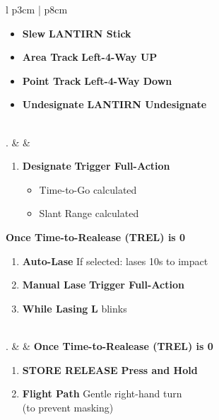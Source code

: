 \documentclass[8pt,usenames,dvipsnames,twoside]{article}
\begin{document}
\begin{center}
\begin{longtable}{l p{3cm} | p{8cm}}
\begin{minipage}[t]{\linewidth}
\begin{itemize}
						\item \textbf{Slew} \dotfill \textbf{LANTIRN Stick}
						\item \textbf{Area Track} \dotfill \textbf{Left-4-Way UP}
						\item \textbf{Point Track} \dotfill \textbf{Left-4-Way Down}
						\item \textbf{Undesignate} \dotfill \textbf{LANTIRN Undesignate}
					\end{itemize}
				\end{minipage} \\
				. &  & 
				\begin{minipage}[t]{\linewidth}
					\vspace{-7pt}
					\begin{enumerate}[label=(\alph*)]
						\item \textbf{Designate} \dotfill \textbf{Trigger Full-Action}
						\begin{itemize}
							\item Time-to-Go calculated
							\item Slant Range calculated
						\end{itemize}
					\end{enumerate}
					\textbf{Once Time-to-Realease (TREL) is 0}
					\begin{enumerate}[label=(\alph*), resume]
						\item \textbf{Auto-Lase} \dotfill If selected: lases 10s to impact
						\item \textbf{Manual Lase} \dotfill \textbf{Trigger Full-Action}
						\item \textbf{While Lasing} \dotfill \textbf{L} blinks
					\end{enumerate}
				\end{minipage} \\
				. &  & \textbf{Once Time-to-Realease (TREL) is 0}
				\begin{minipage}[t]{\linewidth}
					\vspace{-7pt}
					\begin{enumerate}[label=(\alph*)]
						\item \textbf{STORE RELEASE} \dotfill \textbf{Press and Hold}
						\item \textbf{Flight Path} \dotfill Gentle right-hand turn \\
						\hfill (to prevent masking)
					\end{enumerate}
				\end{minipage} \\
				\bottomrule
			\end{longtable}
		\end{center}
	
\end{document}
